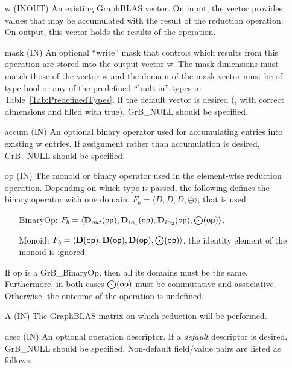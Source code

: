 \begin{itemize}[leftmargin=1.1in]
    \item[{\sf w}]    ({\sf INOUT}) An existing GraphBLAS vector.  On input,
    the vector provides values that may be accumulated with the result of the
    reduction operation.  On output, this vector holds the results of the
    operation.

    \item[{\sf mask}] ({\sf IN}) An optional ``write'' mask that controls which
    results from this operation are stored into the output vector {\sf w}. The 
    mask dimensions must match those of the vector {\sf w} and the domain of the
    {\sf mask} vector must be of type {\sf bool} or any of the predefined 
    ``built-in'' types in Table~\ref{Tab:PredefinedTypes}.  If the default
    vector is desired (\ie, with correct dimensions and filled with {\sf true}), 
    {\sf GrB\_NULL} should be specified.

    \item[{\sf accum}] ({\sf IN}) An optional binary operator used for accumulating
    entries into existing {\sf w} entries. If assignment rather than accumulation is
    desired, {\sf GrB\_NULL} should be specified.

    \item[{\sf op}]    ({\sf IN}) The monoid or binary operator 
    used in the element-wise reduction operation.  Depending on which type is
    passed, the following defines the binary operator with one domain, $F_b=\langle D,D,D,\oplus \rangle$, that is used:
    \begin{itemize}[leftmargin=1.1in]
    \item[BinaryOp:] $F_b = \langle \mbox{$\mathbf{D}_{out}$}({\sf op}), \mbox{$\mathbf{D}_{in_{1}}$}({\sf op}),
    \mbox{$\mathbf{D}_{in_{2}}$}({\sf op}),\bold{\bigodot}({\sf op})\rangle$.  
    \item[Monoid:] $F_b = \langle \bold{D}({\sf op}), \bold{D}({\sf op}),
    \bold{D}({\sf op}),\bold{\bigodot}({\sf op})\rangle$,
    the identity element of the monoid is ignored. 
    \end{itemize}
    If {\sf op} is a {\sf GrB\_BinaryOp}, then all its domains must be the same.
    Furthermore, in both cases $\bold{\bigodot}({\sf op})$ must be commutative and associative. Otherwise, the outcome of the operation is undefined.
    
    \item[{\sf A}]     ({\sf IN}) The GraphBLAS matrix on which
	    reduction will be performed.

    \item[{\sf desc}] ({\sf IN}) An optional operation descriptor. If
    a \emph{default} descriptor is desired, {\sf GrB\_NULL} should be
    specified. Non-default field/value pairs are listed as follows:  \\


\end{itemize}
